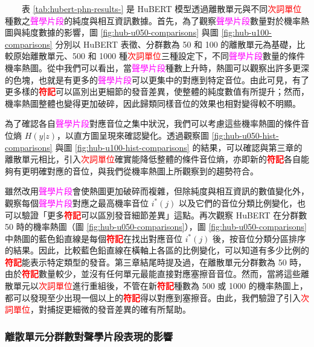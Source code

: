 　　表 \ref{tab:hubert-phn-results-} 是 HuBERT 模型透過離散單元與不同\textcolor{red}{次詞單位}種數之\textcolor{magenta}{聲學片段}的純度與相互資訊數據。首先，為了觀察\textcolor{magenta}{聲學片段}數量對於機率熱圖與純度數據的影響，圖 \ref{fig:hub-u050-comparisons} 與圖 \ref{fig:hub-u100-comparisons} 分別以 HuBERT 表徵、分群數為 50 和 100 的離散單元為基礎，比較原始離散單元、500 和 1000 種\textcolor{red}{次詞單位}三種設定下，不同\textcolor{magenta}{聲學片段}數量的條件機率熱圖。從中我們可以看出，當\textcolor{magenta}{聲學片段}種數上升時，熱圖可以觀察出許多更深的色塊，也就是有更多的\textcolor{magenta}{聲學片段}可以更集中的對應到特定音位。由此可見，有了更多樣的\textbf{\textcolor{red}{符記}}可以區別出更細節的發音差異，使整體的純度數值有所提升；然而，機率熱圖整體也變得更加破碎，因此歸類同樣音位的效果也相對變得較不明顯。

        為了確認各自\textcolor{magenta}{聲學片段}對應音位之集中狀況，我們可以考慮這些機率熱圖的條件音位熵 $H(y|z)$，以直方圖呈現來確認變化。透過觀察圖 \ref{fig:hub-u050-hist-comparisons} 與圖 \ref{fig:hub-u100-hist-comparisons} 的結果，可以確認與第三章的離散單元相比，引入\textcolor{red}{次詞單位}確實能降低整體的條件音位熵，亦即新的\textbf{\textcolor{red}{符記}}各自能夠有更明確對應的音位，與我們從機率熱圖上所觀察到的趨勢符合。

        雖然改用\textcolor{magenta}{聲學片段}會使熱圖更加破碎而複雜，但除純度與相互資訊的數值變化外，觀察每個\textcolor{magenta}{聲學片段}對應之最高機率音位 $i^*(j)$ 以及它們的音位分類比例變化，也可以驗證「更多\textbf{\textcolor{red}{符記}}可以區別發音細節差異」這點。再次觀察 HuBERT 在分群數 50 時的機率熱圖（圖 \ref{fig:hub-u050-comparisons}），圖 \ref{fig:hub-u050-comparisons} 中熱圖的藍色鉛直線是每個\textbf{\textcolor{red}{符記}}在找出對應音位 $i^*(j)$ 後，按音位分類分區排序的結果。因此，比較藍色鉛直線在橫軸上各區的比例變化，可以知道有多少比例的\textbf{\textcolor{red}{符記}}能表示特定類型的發音。第三章結尾時提及過，在離散單元分群數為 50 時，由於\textbf{\textcolor{red}{符記}}數量較少，並沒有任何單元最能直接對應塞擦音音位。然而，當將這些離散單元以\textcolor{red}{次詞單位}進行重組後，不管在新\textbf{\textcolor{red}{符記}}種數為 500 或 1000 的機率熱圖上，都可以發現至少出現一個以上的\textbf{\textcolor{red}{符記}}得以對應到塞擦音。由此，我們驗證了引入\textcolor{red}{次詞單位}，對捕捉更細微的發音差異的確有所幫助。

\subsubsection{離散單元分群數對聲學片段表現的影響}

